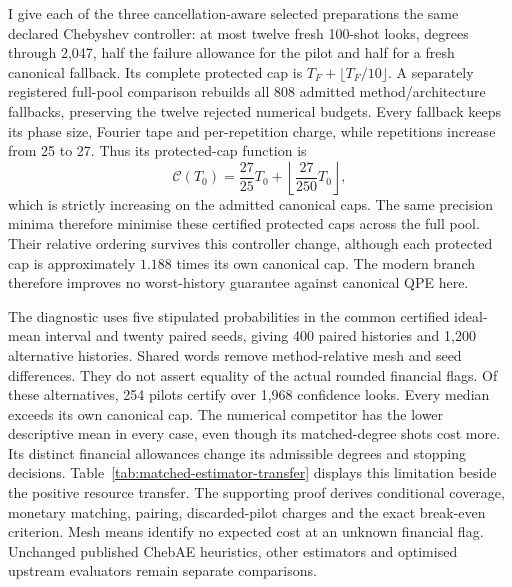 \documentclass[11pt]{article}
\begin{document}
I give each of the three cancellation-aware selected preparations the same declared
Chebyshev controller: at most twelve fresh 100-shot looks, degrees through
2,047, half the failure allowance for the pilot and half for a fresh
canonical fallback. Its complete protected cap is
$T_F+\lfloor T_F/10\rfloor$. A separately registered full-pool comparison
rebuilds all 808 admitted method/architecture fallbacks, preserving the
twelve rejected numerical budgets. Every fallback keeps its phase size,
Fourier tape and per-repetition charge, while repetitions increase from
25 to 27. Thus its protected-cap function is
\begin{equation}
\mathcal C(T_0)=\frac{27}{25}T_0+
                    \left\lfloor\frac{27}{250}T_0\right\rfloor,
\label{eq:matched-poolwise-protected-cap}
\end{equation}
which is strictly increasing on the admitted canonical caps. The same
precision minima therefore minimise these certified protected caps across
the full pool. Their relative ordering survives this controller change,
although each protected cap is approximately $1.188$ times its own
canonical cap. The modern branch therefore improves no worst-history
guarantee against canonical QPE here.

The diagnostic uses five stipulated probabilities in the common certified
ideal-mean interval and twenty paired seeds, giving 400 paired histories
and 1,200 alternative histories. Shared words remove method-relative
mesh and seed differences. They do not assert equality of the actual
rounded financial flags. Of these alternatives, 254 pilots certify over
1,968 confidence looks. Every median exceeds its own canonical cap.
The numerical competitor has the lower descriptive mean in every case,
even though its matched-degree shots cost more. Its distinct financial
allowances change its admissible degrees and stopping decisions.
Table~\ref{tab:matched-estimator-transfer} displays this limitation beside
the positive resource transfer. The supporting proof derives conditional
coverage, monetary matching, pairing, discarded-pilot charges and the
exact break-even criterion. Mesh means identify no expected cost at an
unknown financial flag. Unchanged published ChebAE heuristics, other
estimators and optimised upstream evaluators remain separate comparisons.
\end{document}
